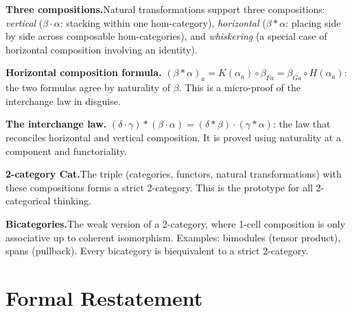 \begin{summarybox}
\textbf{Three compositions.}\quad Natural transformations support three
compositions: \emph{vertical} ($\beta \cdot \alpha$: stacking within one
hom-category), \emph{horizontal} ($\beta * \alpha$: placing side by side
across composable hom-categories), and \emph{whiskering} (a special case
of horizontal composition involving an identity).

\textbf{Horizontal composition formula.}\quad
$(\beta * \alpha)_a = K(\alpha_a) \circ \beta_{Fa} = \beta_{Ga} \circ H(\alpha_a)$:
the two formulas agree by naturality of $\beta$. This is a micro-proof of
the interchange law in disguise.

\textbf{The interchange law.}\quad
$(\delta \cdot \gamma) * (\beta \cdot \alpha) = (\delta * \beta) \cdot (\gamma * \alpha)$:
the law that reconciles horizontal and vertical composition. It is proved
using naturality at a component and functoriality.

\textbf{2-category \textbf{Cat}.}\quad The triple (categories, functors,
natural transformations) with these compositions forms a strict 2-category.
This is the prototype for all 2-categorical thinking.

\textbf{Bicategories.}\quad The weak version of a 2-category, where
1-cell composition is only associative up to coherent isomorphism. Examples:
bimodules (tensor product), spans (pullback). Every bicategory is
biequivalent to a strict 2-category.
\end{summarybox}


\section{Formal Restatement}
\label{sec:2cat-formal}

